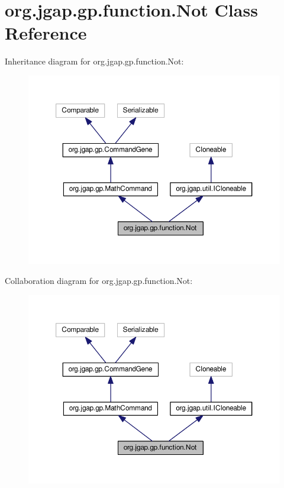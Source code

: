 \hypertarget{classorg_1_1jgap_1_1gp_1_1function_1_1_not}{\section{org.\-jgap.\-gp.\-function.\-Not Class Reference}
\label{classorg_1_1jgap_1_1gp_1_1function_1_1_not}
}


Inheritance diagram for org.\-jgap.\-gp.\-function.\-Not\-:
\nopagebreak
\begin{figure}[H]
\begin{center}
\leavevmode
\includegraphics[width=350pt]{classorg_1_1jgap_1_1gp_1_1function_1_1_not__inherit__graph}
\end{center}
\end{figure}


Collaboration diagram for org.\-jgap.\-gp.\-function.\-Not\-:
\nopagebreak
\begin{figure}[H]
\begin{center}
\leavevmode
\includegraphics[width=350pt]{classorg_1_1jgap_1_1gp_1_1function_1_1_not__coll__graph}
\end{center}
\end{figure}
